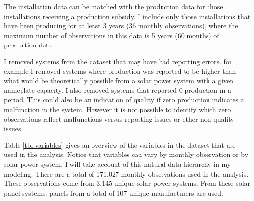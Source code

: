 \documentclass[a4paper]{article}
\begin{document}
The installation data can be matched with the production data for those installations receiving a production subsidy. I include only those installations that have been producing for at least 3 years (36 monthly observations), where the maximum number of observations in this data is 5 years (60 months) of production data.

I removed systems from the dataset that may have had reporting errors. for example I removed systems where production was reported to be higher than what would be theoretically possible from a solar power system with a given nameplate capacity. I also removed systems that reported 0 production in a period. This could also be an indication of quality if zero production indicates a malfunction in the system. However it is not possible to identify which zero observations reflect malfunctions versus reporting issues or other non-quality issues.

Table \ref{tbl:variables} gives an overview of the variables in the dataset that are used in the analysis. Notice that variables can vary by monthly observation or by solar power system. I will take account of this natural data hierarchy in my modeling. There are a total of 171,027 monthly observations used in the analysis. These observations come from 3,145 unique solar power systems. From these solar panel systems, panels from a total of 107 unique manufacturers are used.
\end{document}
